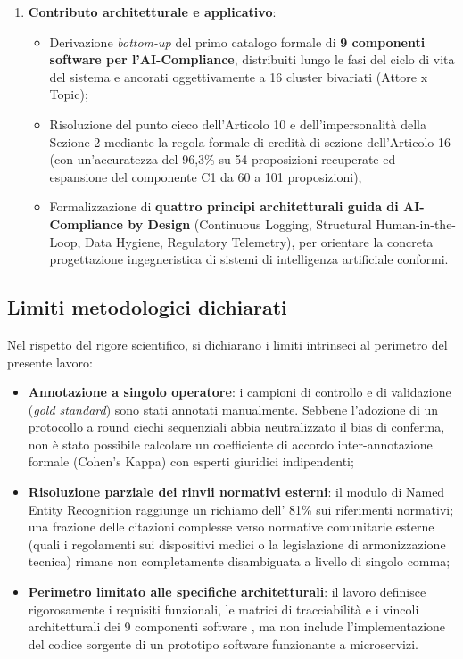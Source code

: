 \documentclass[12pt,a4paper,oneside]{report}
\begin{document}
\begin{enumerate}
\begin{itemize}
        \item Modellazione algebrica della struttura concettuale mediante Analisi Formale dei Concetti (reticolo Iceberg di 91 concetti formali e 177 relazioni di sussunzione su 4 livelli gerarchici), provando il ruolo di perno strutturante della presenza dell'attore giuridico (\texttt{has\_attore})
    \end{itemize}
    \item \textbf{Contributo architetturale e applicativo}:
    \begin{itemize}
        \item Derivazione \textit{bottom-up} del primo catalogo formale di \textbf{9 componenti software per l'AI-Compliance}, distribuiti lungo le fasi del ciclo di vita del sistema e ancorati oggettivamente a 16 cluster bivariati (Attore x Topic);
        \item Risoluzione del punto cieco dell'Articolo 10 e dell'impersonalità della Sezione 2 mediante la regola formale di eredità di sezione dell'Articolo 16 (con un'accuratezza del 96,3\% su 54 proposizioni recuperate ed espansione del componente C1 da 60 a 101 proposizioni),
        \item Formalizzazione di \textbf{quattro principi architetturali guida di AI-Compliance by Design} (Continuous Logging, Structural Human-in-the-Loop, Data Hygiene, Regulatory Telemetry), per orientare la concreta progettazione ingegneristica di sistemi di intelligenza artificiale conformi.
    \end{itemize}
\end{enumerate}

\subsection{Limiti metodologici dichiarati}
Nel rispetto del rigore scientifico, si dichiarano i limiti intrinseci al perimetro del presente lavoro:
\begin{itemize}
    \item \textbf{Annotazione a singolo operatore}: i campioni di controllo e di validazione (\textit{gold standard}) sono stati annotati manualmente. Sebbene l'adozione di un protocollo a round ciechi sequenziali abbia neutralizzato il bias di conferma, non è stato possibile calcolare un coefficiente di accordo inter-annotazione formale (Cohen's Kappa) con esperti giuridici indipendenti;
    \item \textbf{Risoluzione parziale dei rinvii normativi esterni}: il modulo di Named Entity Recognition raggiunge un richiamo dell' 81\% sui riferimenti normativi; una frazione delle citazioni complesse verso normative comunitarie esterne (quali i regolamenti sui dispositivi medici o la legislazione di armonizzazione tecnica) rimane non completamente disambiguata a livello di singolo comma;
    \item \textbf{Perimetro limitato alle specifiche architetturali}: il lavoro definisce rigorosamente i requisiti funzionali, le matrici di tracciabilità e i vincoli architetturali dei 9 componenti software , ma non include l'implementazione del codice sorgente di un prototipo software funzionante a microservizi.
\end{itemize}
\end{document}
